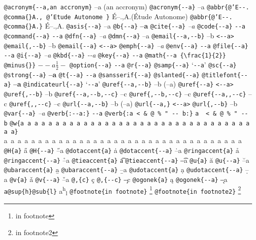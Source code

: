 \documentclass{book}
\begin{document}
\begin{titlepage}
\texttt{@acronym\{{-}{-}a,an accronym\}} --a (an accronym)
\texttt{@acronym\{{-}{-}a\}} --a
\texttt{@abbr\{@'E{-}{-}. @comma\{\}A., @'Etude Autonome \}} \'{E}--.\@ ,A.\@ (\'{E}tude Autonome)
\texttt{@abbr\{@'E{-}{-}. @comma\{\}A.\}} \'{E}--.\@ ,A.\@
\texttt{@asis\{{-}{-}a\}} --a
\texttt{@b\{{-}{-}a\}} \textbf{--a}
\texttt{@cite\{{-}{-}a\}} \textit{--a}
\texttt{@code\{{-}{-}a\}} \texttt{{-}{-}a}
\texttt{@command\{{-}{-}a\}} \texttt{{-}{-}a}
\texttt{@dfn\{{-}{-}a\}} \emph{--a}
\texttt{@dmn\{{-}{-}a\}} --a
\texttt{@email\{{-}{-}a,{-}{-}b\}} --b \texttt{<{-}{-}a>}
\texttt{@email\{,{-}{-}b\}} --b
\texttt{@email\{{-}{-}a\}} \texttt{<{-}{-}a>}
\texttt{@emph\{{-}{-}a\}} \emph{--a}
\texttt{@env\{{-}{-}a\}} \texttt{{-}{-}a}
\texttt{@file\{{-}{-}a\}} \texttt{{-}{-}a}
\texttt{@i\{{-}{-}a\}} \textit{--a}
\texttt{@kbd\{{-}{-}a\}} {\ttfamily\textsl{{-}{-}a}}
\texttt{@key\{{-}{-}a\}} \texttt{{-}{-}a}
\texttt{@math\{{-}{-}a \{\textbackslash{}frac\{1\}\{2\}\} @minus\{\}\}} $--a {\frac{1}{2}} -$
\texttt{@option\{{-}{-}a\}} \texttt{{-}{-}a}
\texttt{@r\{{-}{-}a\}} 
\texttt{@samp\{{-}{-}a\}} `\texttt{{-}{-}a}'
\texttt{@sc\{{-}{-}a\}} 
\texttt{@strong\{{-}{-}a\}} \textbf{--a}
\texttt{@t\{{-}{-}a\}} \texttt{{-}{-}a}
\texttt{@sansserif\{{-}{-}a\}} 
\texttt{@slanted\{{-}{-}a\}} 
\texttt{@titlefont\{{-}{-}a\}} {\Huge \bfseries --a}
\texttt{@indicateurl\{{-}{-}a\}} `\texttt{{-}{-}a}'
\texttt{@uref\{{-}{-}a,{-}{-}b\}} --b (--a)
\texttt{@uref\{{-}{-}a\}} \texttt{<{-}{-}a>}
\texttt{@uref\{,{-}{-}b\}} --b
\texttt{@uref\{{-}{-}a,{-}{-}b,{-}{-}c\}} --c
\texttt{@uref\{,{-}{-}b,{-}{-}c\}} --c
\texttt{@uref\{{-}{-}a,,{-}{-}c\}} --c
\texttt{@uref\{,,{-}{-}c\}} --c
\texttt{@url\{{-}{-}a,{-}{-}b\}} --b (--a)
\texttt{@url\{{-}{-}a,\}} \texttt{<{-}{-}a>}
\texttt{@url\{,{-}{-}b\}} --b
\texttt{@var\{{-}{-}a\}} \emph{--a}
\texttt{@verb\{:{-}{-}a:\}} \verb:--a:
\texttt{@verb\{:a  < \& @ \% " {-}{-}    b:\}} \verb:a  < & @ % " --    b:
\texttt{@w\{a a a a a a a a a a a a a a a a a a a a a a a a a a a a a a a a a a a\}} \hbox{a a a a a a a a a a a a a a a a a a a a a a a a a a a a a a a a a a a}
\texttt{@H\{a\}} \H{a}
\texttt{@H\{{-}{-}a\}} \H{--a}
\texttt{@dotaccent\{a\}} \.{a}
\texttt{@dotaccent\{{-}{-}a\}} \.{--a}
\texttt{@ringaccent\{a\}} \r{a}
\texttt{@ringaccent\{{-}{-}a\}} \r{--a}
\texttt{@tieaccent\{a\}} \t{a}
\texttt{@tieaccent\{{-}{-}a\}} \t{--a}
\texttt{@u\{a\}} \u{a}
\texttt{@u\{{-}{-}a\}} \u{--a}
\texttt{@ubaraccent\{a\}} \b{a}
\texttt{@ubaraccent\{{-}{-}a\}} \b{--a}
\texttt{@udotaccent\{a\}} \d{a}
\texttt{@udotaccent\{{-}{-}a\}} \d{--a}
\texttt{@v\{a\}} \v{a}
\texttt{@v\{{-}{-}a\}} \v{--a}
\texttt{@,\{c\}} \c{c}
\texttt{@,\{{-}{-}c\}} \c{--c}
\texttt{@ogonek\{a\}} \k{a}
\texttt{@ogonek\{{-}{-}a\}} \k{--a}
\texttt{a@sup\{h\}@sub\{l\}} a\textsuperscript{h}\textsubscript{l}
\texttt{@footnote\{in footnote\}} \footnote{in footnote}
\texttt{@footnote\{in footnote2\}} \footnote{in footnote2}


\end{titlepage}
\end{document}
